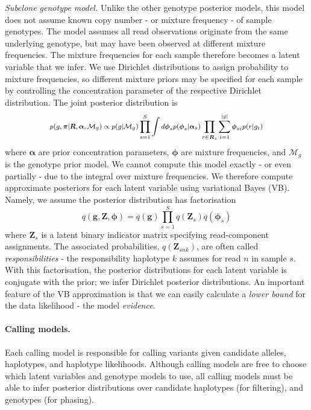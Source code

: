 \documentclass[notitlepage, twocolumn, 10pt]{article}
\begin{document}
\vspace{3mm}
\noindent\emph{Subclone genotype model.} Unlike the other genotype posterior models, this model does not assume known copy number - or mixture frequency - of sample genotypes. The model assumes all read observations originate from the same underlying genotype, but may have been observed at different mixture frequencies. The mixture frequencies for each sample therefore becomes a latent variable that we infer. We use Dirichlet distributions to assign probability to mixture frequencies, so different mixture priors may be specified for each sample by controlling the concentration parameter of the respective Dirichlet distribution. The joint posterior distribution is 
\begin{equation*}
\footnotesize
p(g, \boldsymbol{\pi} | \boldsymbol{R}, \boldsymbol{\alpha}, \mathcal{M}_g) \propto p(g | \mathcal{M}_g) \prod_{s=1}^S \int d \boldsymbol{\phi}_s p(\boldsymbol{\phi}_s | \boldsymbol{\alpha}_s) \prod_{r \in \boldsymbol{R}_s} \sum_{i = 1}^{|g|} \boldsymbol{\phi}_{si} p(r | g_i)
\end{equation*}
where $\boldsymbol{\alpha}$ are prior concentration parameters, $\boldsymbol{\phi}$ are mixture frequencies, and $\mathcal{M}_g$ is the genotype prior model. We cannot compute this model exactly - or even partially - due to the integral over mixture frequencies. We therefore compute approximate posteriors for each latent variable using variational Bayes (VB). Namely, we assume the posterior distribution has factorisation
\begin{equation*}
    q(\boldsymbol{g}, \boldsymbol{Z}, \boldsymbol{\phi}) = q(\boldsymbol{g}) \prod_{s = 1}^S q(\boldsymbol{Z}_s) q(\boldsymbol{\phi}_s)
\end{equation*}
where $\boldsymbol{Z}_s$ is a latent binary indicator matrix specifying read-component assignments. The associated probabilities, $q(\boldsymbol{Z}_{snk})$, are often called \emph{responsibilities} - the responsibility haplotype $k$ assumes for read $n$ in sample $s$. With this factorisation, the posterior distributions for each latent variable is conjugate with the prior; we infer Dirichlet posterior distributions. An important feature of the VB approximation is that we can easily calculate a \emph{lower bound} for the data likelihood - the model \emph{evidence}.

\paragraph*{Calling models.} Each calling model is responsible for calling variants given candidate alleles, haplotypes, and haplotype likelihoods. Although calling models are free to choose which latent variables and genotype models to use, all calling models must be able to infer posterior distributions over candidate haplotypes (for filtering), and genotypes (for phasing).
\end{document}
